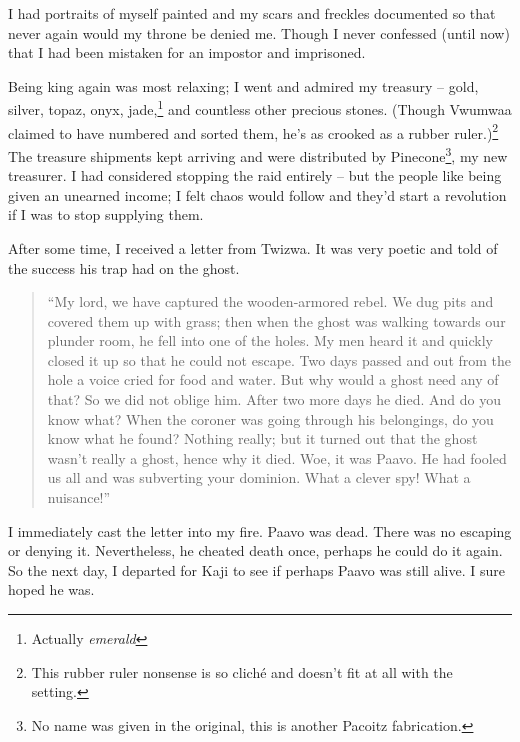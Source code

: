 I had portraits of myself painted and my scars and freckles documented so that never again would my throne be denied me. Though I never confessed (until now) that I had been mistaken for an impostor and imprisoned.

Being king again was most relaxing; I went and admired my treasury -- gold, silver, topaz, onyx, jade,\footnote{Actually \emph{emerald}} and countless other precious stones. (Though Vwu\-mwaa claimed to have numbered and sorted them, he's as crooked as a rubber ruler.)\footnote{This rubber ruler nonsense is so clich\'{e} and doesn't fit at all with the setting.} The treasure shipments kept arriving and were distributed by Pine\-cone\footnote{No name was given in the original, this is another Pa\-co\-itz fabrication.}, my new treasurer. I had considered stopping the raid entirely -- but the people like being given an unearned income; I felt chaos would follow and they'd start a revolution if I was to stop supplying them.

After some time, I received a letter from Twi\-zwa. It was very poetic and told of the success his trap had on the ghost.

\begin{quote}``My lord, we have captured the wooden-armored rebel. We dug pits and covered them up with grass; then when the ghost was walking towards our plunder room, he fell into one of the holes. My men heard it and quickly closed it up so that he could not escape. Two days passed and out from the hole a voice cried for food and water. But why would a ghost need any of that? So we did not oblige him. After two more days he died. And do you know what? When the coroner was going through his belongings, do you know what he found? Nothing really; but it turned out that the ghost wasn't really a ghost, hence why it died. Woe, it was Paa\-vo. He had fooled us all and was subverting your dominion. What a clever spy! What a nuisance!''
\end{quote}

I immediately cast the letter into my fire. Paa\-vo was dead. There was no escaping or denying it. Nevertheless, he cheated death once, perhaps he could do it again. So the next day, I departed for Ka\-ji to see if perhaps Paa\-vo was still alive. I sure hoped he was.
